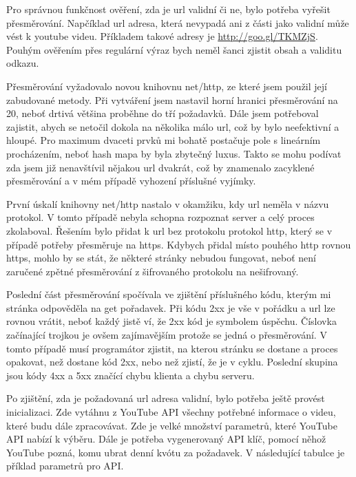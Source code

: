 \par Pro správnou funkčnost ověření, zda je url validní či ne, bylo potřeba vyřešit přesměrování. Napčíklad url adresa, která nevypadá ani z části jako validní může vést k youtube videu. Příkladem takové adresy je \url{http://goo.gl/TKMZjS}. Pouhým ověřením přes regulární výraz bych neměl šanci zjistit obsah a validitu odkazu. 
\par Přesměrování vyžadovalo novou knihovnu net/http, ze které jsem použil její zabudované metody. Při vytváření jsem nastavil horní hranici přesměrování na 20, neboť drtivá většina proběhne do tří požadavků. Dále jsem potřeboval zajistit, abych se netočil dokola na několika málo url, což by bylo neefektivní a hloupé. Pro maximum dvaceti prvků mi bohatě postačuje pole s lineárním procházením, neboť hash mapa by byla zbytečný luxus. Takto se mohu podívat zda jsem již nenavštívil nějakou url dvakrát, což by znamenalo zacyklené přesměrování a v mém případě vyhození příslušné vyjímky.
\par První úskalí knihovny net/http nastalo v okamžiku, kdy url neměla v názvu protokol. V tomto případě nebyla schopna rozpoznat server a celý proces zkolaboval. Řešením bylo přidat k url bez protokolu protokol http, který se v případě potřeby přesměruje na https. Kdybych přidal místo pouhého http rovnou https, mohlo by se stát, že některé stránky nebudou fungovat, neboť není zaručené zpětné přesměrování z šifrovaného protokolu na nešifrovaný.
\par Poslední část přesměrování spočívala ve zjištění příslušného kódu, kterým mi stránka odpověděla na get pořadavek. Při kódu 2xx je vše v pořádku a url lze rovnou vrátit, neboť každý jistě ví, že 2xx kód je symbolem úspěchu. Číslovka začínající trojkou je ovšem zajímavějším protože se jedná o přesměrování. V tomto případě musí programátor zjistit, na kterou stránku se dostane a proces opakovat, než dostane kód 2xx, nebo než zjistí, že je v cyklu. Poslední skupina jsou kódy 4xx a 5xx značící chybu klienta a chybu serveru.

\par Po zjištění, zda je požadovaná url adresa validní, bylo potřeba ještě provést inicializaci. Zde vytáhnu z YouTube API všechny potřebné informace o videu, které budu dále zpracovávat. Zde je velké množství parametrů, které YouTube API nabízí k výběru. Dále je potřeba vygenerovaný API klíč, pomocí něhož YouTube pozná, komu ubrat denní kvótu za požadavek. V následující tabulce je příklad parametrů pro API.

